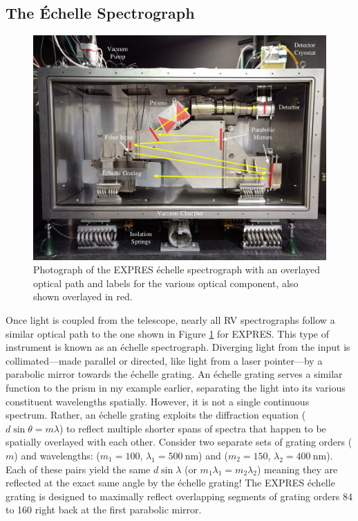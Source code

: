 \subsection{The \'Echelle Spectrograph} \label{intro:optics:echelle}

\begin{figure}
    \centering
    \includegraphics[width=\textwidth]{figures-1/expres.pdf}
    \caption[The EXPRES \'Echelle Spectrograph and Optical Path]{Photograph of the EXPRES \'echelle spectrograph with an overlayed optical path and labels for the various optical component, also shown overlayed in red.}
    \label{fig:expres}
\end{figure}

Once light is coupled from the telescope, nearly all RV spectrographs follow a similar optical path to the one shown in Figure \ref{fig:expres} for EXPRES. This type of instrument is known as an \'echelle spectrograph. Diverging light from the input is collimated---made parallel or directed, like light from a laser pointer---by a parabolic mirror towards the \'echelle grating. An \'echelle grating serves a similar function to the prism in my example earlier, separating the light into its various constituent wavelengths spatially. However, it is not a single continuous spectrum. Rather, an \'echelle grating exploits the diffraction equation ($d \sin{\theta} = m \lambda$) to reflect multiple shorter spans of spectra that happen to be spatially overlayed with each other. Consider two separate sets of grating orders ($m$) and wavelengths: ($m_1=100$, $\lambda_1=500~\mathrm{nm}$) and ($m_2=150$, $\lambda_2=400~\mathrm{nm}$). Each of these pairs yield the same $d\sin{\lambda}$ (or $m_1\lambda_1 = m_2\lambda_2$) meaning they are reflected at the exact same angle by the \'echelle grating! The EXPRES \'echelle grating is designed to maximally reflect overlapping segments of grating orders 84 to 160 right back at the first parabolic mirror.

